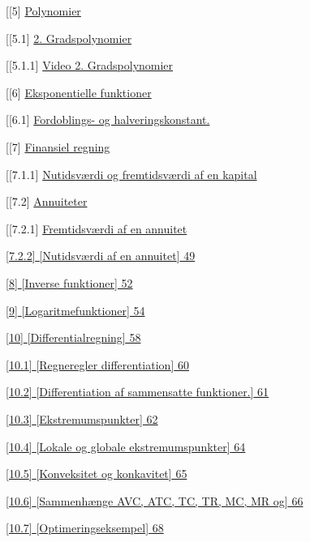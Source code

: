 \documentclass[]{book}
\begin{document}
{[}{[}5{]} \protect\hyperlink{polynomier}{Polynomier}

{[}{[}5.1{]} \protect\hyperlink{gradspolynomier}{2. Gradspolynomier}

{[}{[}5.1.1{]} \protect\hyperlink{video-2.-gradspolynomier}{Video 2.
Gradspolynomier}

{[}{[}6{]} \protect\hyperlink{eksponentielle-funktioner}{Eksponentielle
funktioner}

{[}{[}6.1{]}
\protect\hyperlink{fordoblings--og-halveringskonstant.}{Fordoblings- og
halveringskonstant.}

{[}{[}7{]} \protect\hyperlink{finansiel-regning}{Finansiel regning}

{[}{[}7.1.1{]}
\protect\hyperlink{nutidsvuxe6rdi-og-fremtidsvuxe6rdi-af-en-kapital}{Nutidsværdi
og fremtidsværdi af en kapital}

{[}{[}7.2{]} \protect\hyperlink{annuiteter}{Annuiteter}

{[}{[}7.2.1{]}
\protect\hyperlink{fremtidsvuxe6rdi-af-en-annuitet}{Fremtidsværdi af en
annuitet}

\protect\hyperlink{nutidsvuxe6rdi-af-en-annuitet}{{[}7.2.2{]}
{[}Nutidsværdi af en annuitet{]} 49}

\protect\hyperlink{inverse-funktioner}{{[}8{]} {[}Inverse funktioner{]}
52}

\protect\hyperlink{logaritmefunktioner}{{[}9{]}
{[}Logaritmefunktioner{]} 54}

\protect\hyperlink{differentialregning}{{[}10{]}
{[}Differentialregning{]} 58}

\protect\hyperlink{regneregler-differentiation}{{[}10.1{]}
{[}Regneregler differentiation{]} 60}

\protect\hyperlink{differentiation-af-sammensatte-funktioner.}{{[}10.2{]}
{[}Differentiation af sammensatte funktioner.{]} 61}

\protect\hyperlink{ekstremumspunkter}{{[}10.3{]} {[}Ekstremumspunkter{]}
62}

\protect\hyperlink{lokale-og-globale-ekstremumspunkter}{{[}10.4{]}
{[}Lokale og globale ekstremumspunkter{]} 64}

\protect\hyperlink{konveksitet-og-konkavitet}{{[}10.5{]} {[}Konveksitet
og konkavitet{]} 65}

\protect\hyperlink{sammenhuxe6nge-avc-atc-tc-tr-mc-mr-og-mathbfpi}{{[}10.6{]}
{[}Sammenhænge AVC, ATC, TC, TR, MC, MR og{]} 66}

\protect\hyperlink{optimeringseksempel}{{[}10.7{]}
{[}Optimeringseksempel{]} 68}
\end{document}

